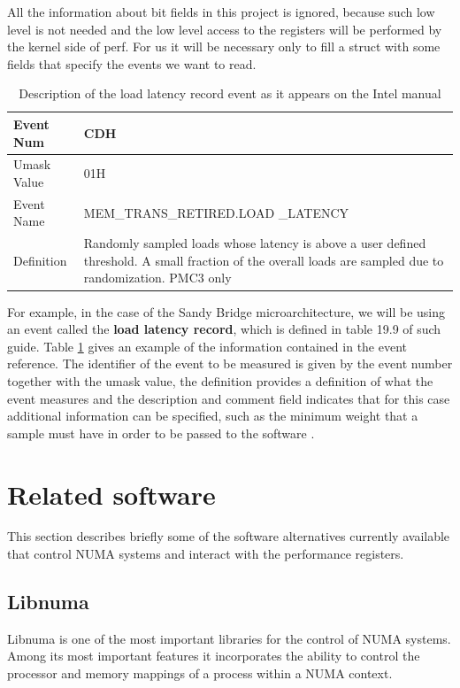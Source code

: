 All the information about bit fields in this project is ignored, because such low level is not needed and the low level access to the registers will be performed by the kernel side of perf. For us it will be necessary only to fill a struct with some fields that specify the events we want to read.
\begin{table}
	\centering
		\begin{tabularx}{\textwidth}{|l|X|}
		\hline
			Event Num & CDH\\
			\hline
			Umask Value & 01H\\
			\hline
			Event Name & MEM\_TRANS\_RETIRED.LOAD \_LATENCY\\
			\hline
			Definition & Randomly sampled loads whose latency is above a user defined threshold. A small fraction of the overall loads are sampled due to randomization. PMC3 only\\
			\hline
		\end{tabularx}
		\caption{Description of the load latency record event as it appears on the Intel manual}
		\label{table:lldescr}
\end{table}
For example, in the case of the Sandy Bridge microarchitecture, we will be using an event called the \textbf{load latency record}, which is defined in table 19.9 of such guide. Table \ref{table:lldescr} gives an example of the information contained in the event reference. The identifier of the event to be measured is given by the event number together with the umask value, the definition provides a definition of what the event measures and the description and comment field indicates that for this case additional information can be specified, such as the minimum weight that a sample must have in order to be passed to the software .

\section{Related software}\label{section:relatedsw}
This section describes briefly some of the software alternatives currently available that control NUMA systems and interact with the performance registers.
\subsection{Libnuma}\label{subsection:libnuma}

Libnuma \cite{libnuma} is one of the most important libraries for the control of NUMA systems. Among its most important features it incorporates the ability to control the processor and memory mappings of a process within a NUMA context.

